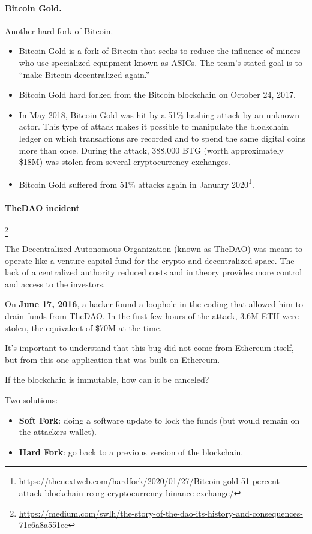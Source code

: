 \paragraph*{Bitcoin Gold.}
Another hard fork of Bitcoin.
\begin{itemize}
	\item Bitcoin Gold is a fork of Bitcoin that seeks to reduce the influence of miners who use specialized equipment known as ASICs. The team's stated goal is to ``make Bitcoin decentralized again.''
	\item Bitcoin Gold hard forked from the Bitcoin blockchain on October 24, 2017.
	\item In May 2018, Bitcoin Gold was hit by a 51\% hashing attack by an unknown actor. This type of attack makes it possible to manipulate the blockchain ledger on which transactions are recorded and to spend the same digital coins more than once. During the attack, 388,000 BTG (worth approximately \$18M) was stolen from several cryptocurrency exchanges.
	\item Bitcoin Gold suffered from 51\% attacks again in January 2020\footnote{{\scriptsize\url{https://thenextweb.com/hardfork/2020/01/27/Bitcoin-gold-51-percent-attack-blockchain-reorg-cryptocurrency-binance-exchange/}}}.
\end{itemize}

\paragraph{TheDAO incident}\label{dao-incident}\footnote{\url{https://medium.com/swlh/the-story-of-the-dao-its-history-and-consequences-71e6a8a551ee}}

The Decentralized Autonomous Organization (known as TheDAO) was meant to operate like a venture capital fund for the crypto and decentralized space. The lack of a centralized authority reduced costs and in theory provides more control and access to the investors.

On \textbf{June 17, 2016}, a hacker found a loophole in the coding that allowed him to drain funds from TheDAO. In the first few hours of the attack, 3.6M ETH were stolen, the equivalent of \$70M at the time.

It’s important to understand that this bug did not come from Ethereum itself, but from this one application that was built on Ethereum.

If the blockchain is immutable, how can it be canceled?

Two solutions:
\begin{itemize}
	\item \textbf{Soft Fork}: doing a software update to lock the funds (but would remain on the attackers wallet).
	\item \textbf{Hard Fork}: go back to a previous version of the blockchain.
\end{itemize}

